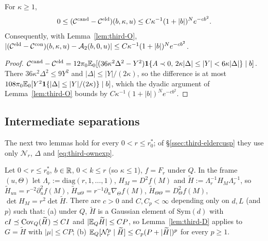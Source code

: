 \begin{lemma}\label{lem:third-Oprime}
For $\kappa\ge1$,
\begin{equation}\label{eq:third-Oprime}
0\le(\mathcal C^{\mathrm{cand}}-\mathcal C^{\mathrm{eld}})(b,\kappa,u)\le C\kappa^{-1}(1+|b|)^Ne^{-cb^2}.
\end{equation}
Consequently, with Lemma~\ref{lem:third-O}, $|(\mathcal C^{\mathrm{eld}}-\mathcal C^{\rm con})(b,\kappa,u)-\mathcal A_2(b,0,u)|\le C\kappa^{-1}(1+|b|)^Ne^{-cb^2}$.
\end{lemma}

\begin{proof}
$\mathcal C^{\mathrm{cand}}-\mathcal C^{\mathrm{eld}}=12\pi_0\mathbb E_0[(36\kappa^2\Delta^2-Y^2)\mathbf 1\{A\prec0,\,2\kappa|\Delta|\le|Y|<6\kappa|\Delta|\}\mid b]$. There $36\kappa^2\Delta^2\le9Y^2$ and $|\Delta|\le|Y|/(2\kappa)$, so the difference is at most $108\pi_0\mathbb E_0[Y^2\mathbf 1\{|\Delta|\le|Y|/(2\kappa)\}\mid b]$, which the dyadic argument of Lemma~\ref{lem:third-O} bounds by $C\kappa^{-1}(1+|b|)^Ne^{-cb^2}$.
\end{proof}

\subsection{Intermediate separations}\label{ssec:third-intermediate}

The next two lemmas hold for every $0<r\le r_0^*$; of \S\ref{ssec:third-eldercusp} they use only $\mathcal N_r$, $\Delta$ and \eqref{eq:third-ownexp}.

\begin{lemma}\label{lem:third-H}
Let $0<r\le r_0^*$, $b\in\mathbb R$, $0<k\le r$ (so $\kappa\le1$), $f=F_r$ under $Q$. In the frame $(u,\Theta)$ let $\Lambda_r:=\mathrm{diag}(r,1,\dots,1)$, $H_M=D^2f(M)$ and $\widetilde H:=\Lambda_r^{-1}H_M\Lambda_r^{-1}$, so $\widetilde H_{uu}=r^{-2}\partial_u^2f(M)$, $\widetilde H_{u\Theta}=r^{-1}\partial_u\nabla_\Theta f(M)$, $\widetilde H_{\Theta\Theta}=D^2_\Theta f(M)$, $\det H_M=r^2\det\widetilde H$. There are $c>0$ and $C,C_p<\infty$ depending only on $d,L$ (and $p$) such that:
\textup{(a)} under $Q$, $\widetilde H$ is a Gaussian element of $\mathrm{Sym}(d)$ with $cI\preceq\operatorname{Cov}_Q(\widetilde H)\preceq CI$ and $|\mathbb E_Q\widetilde H|\le CP$, so Lemma~\ref{lem:third-D} applies to $G=\widetilde H$ with $|\mu|\le CP$;
\textup{(b)} $\mathbb E_Q[\mathcal N_r^p\mid\widetilde H]\le C_p(P+|\widetilde H|)^p$ for every $p\ge1$.
\end{lemma}

